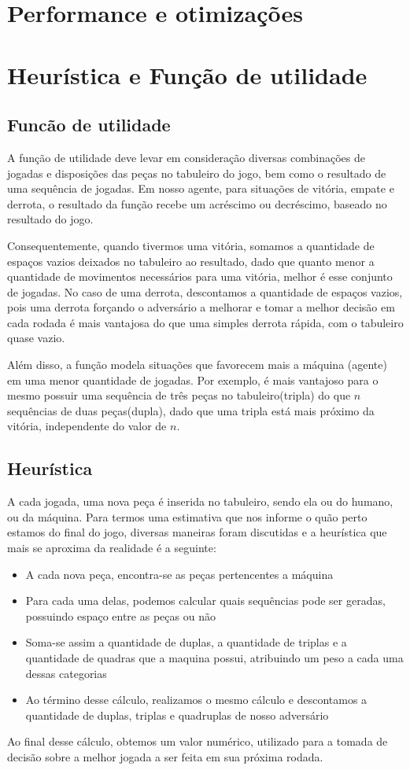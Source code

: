 \documentclass{article}
\begin{document}
\section{Performance e otimizações}

\section{Heurística e Função de utilidade}
  \subsection {Funcão de utilidade}
    A função de utilidade deve levar em consideração diversas combinações de jogadas e disposições das peças
    no tabuleiro do jogo, bem como o resultado de uma sequência de jogadas. Em nosso agente, para situações de
    vitória, empate e derrota, o resultado da função recebe um acréscimo ou decréscimo, baseado no resultado do jogo.

    Consequentemente, quando tivermos uma vitória, somamos a quantidade de espaços vazios deixados no tabuleiro ao
    resultado, dado que quanto menor a quantidade de movimentos necessários para uma vitória, melhor é esse conjunto
    de jogadas. No caso de uma derrota, descontamos a quantidade de espaços vazios, pois uma derrota forçando o
    adversário a melhorar e tomar a melhor decisão em cada rodada é mais vantajosa do que uma simples derrota
    rápida, com o tabuleiro quase vazio.

    Além disso, a função modela situações que favorecem mais a máquina (agente) em uma menor quantidade de jogadas.
    Por exemplo, é mais vantajoso para o mesmo possuir uma sequência de três peças no tabuleiro(tripla) do que $n$
    sequências de duas peças(dupla), dado que uma tripla está mais próximo da vitória, independente do valor de $n$.


  \subsection {Heurística}
    A cada jogada, uma nova peça é inserida no tabuleiro, sendo ela ou do humano, ou da máquina. Para termos uma
    estimativa que nos informe o quão perto estamos do final do jogo, diversas maneiras foram discutidas e a
    heurística que mais se aproxima da realidade é a seguinte:
    \begin{itemize}
      \item A cada nova peça, encontra-se as peças pertencentes a máquina
      \item Para cada uma delas, podemos calcular quais sequências pode ser geradas, possuindo espaço entre as peças
      ou não
      \item Soma-se assim a quantidade de duplas, a quantidade de triplas e a quantidade de quadras que a maquina
      possui, atribuindo um peso a cada uma dessas categorias
      \item Ao término desse cálculo, realizamos o mesmo cálculo e descontamos a quantidade de duplas, triplas e
      quadruplas de nosso adversário
    \end{itemize}

    Ao final desse cálculo, obtemos um valor numérico, utilizado para a tomada de decisão sobre a melhor jogada a ser
    feita em sua próxima rodada.



\end{document}
